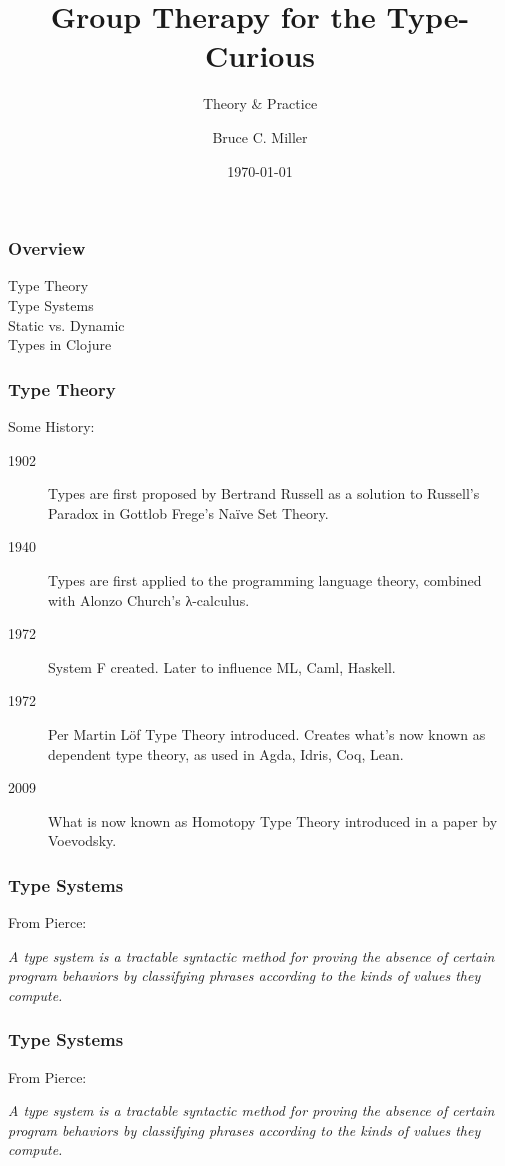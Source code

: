 \documentclass{beamer}
\title{Group Therapy for the Type-Curious}
\subtitle{Theory \& Practice}
\author{Bruce C. Miller}
\institute{bm3719@gmail.com}
\date{\today}
\begin{document}
\begin{frame}
\titlepage
\end{frame}

\begin{frame}
\frametitle{Overview}

\begin{description}
\item[Type Theory]
\item[Type Systems]
\item[Static vs. Dynamic]
\item[Types in Clojure]
\end{description}


\end{frame}
\begin{frame}
  \frametitle{Type Theory}

  Some History:
\begin{description}
\item[1902] Types are first proposed by Bertrand Russell as a solution to
  Russell's Paradox in Gottlob Frege's Naïve Set Theory.
\item[1940] Types are first applied to the programming language theory,
  combined with Alonzo Church's λ-calculus.
\item[1972] System F created.  Later to influence ML, Caml, Haskell.
\item[1972] Per Martin Löf Type Theory introduced.  Creates what's now known as
  dependent type theory, as used in Agda, Idris, Coq, Lean.
\item[2009] What is now known as Homotopy Type Theory introduced in a paper by
  Voevodsky.
\end{description}



\end{frame}

\begin{frame}
\frametitle{Type Systems}

From Pierce:

\vspace{20pt}
\textit{A type system is a tractable syntactic method for proving the absence of
  certain program behaviors by classifying phrases according to the kinds of
  values they compute.}

\end{frame}

\begin{frame}
\frametitle{Type Systems}

From Pierce:

\vspace{20pt}
\textit{A type system is a tractable syntactic method for proving the absence of
  certain program behaviors by classifying phrases according to the kinds of
  values they compute.}

\end{frame}
\end{document}
